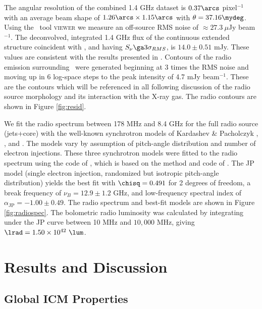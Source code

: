 \documentclass{emulateapj}
\begin{document}
The angular resolution of the combined 1.4 GHz dataset is $0.37\arcs$
pixel$^{-1}$ with an average beam shape of $1.26\arcs \times
1.15\arcs$ with $\theta = 37.16\mydeg$. Using the \casa\ tool
{\textsc{viewer}} we measure an off-source RMS noise of $\approx
27.3~\mu$Jy beam$^{-1}$. The deconvolved, integrated 1.4 GHz flux of
the continuous extended structure coincident with \iras, and having
$S_{\nu} \ga 3\sigma_{RMS}$, is $14.0 \pm 0.51$ mJy. These values are
consistent with the results presented in
\citet{1993ApJ...415...82H}. Contours of the radio emission
surrounding \iras\ were generated beginning at 3 times the RMS noise
and moving up in 6 log-space steps to the peak intensity of 4.7 mJy
beam$^{-1}$. These are the contours which will be referenced in all
following discussion of the radio source morphology and its
interaction with the X-ray gas. The radio contours are shown in Figure
\ref{fig:resid}.

We fit the radio spectrum between 178 MHz and 8.4 GHz for the full
radio source (jets+core) with the well-known synchrotron models of
Kardashev \& Pacholczyk \citep[KP][]{1962SvA.....6..317K, pach},
\citet[JP][]{1973A&A....26..423J}, and
\citet[CI][]{1987MNRAS.225..335H}. The models vary by assumption of
pitch-angle distribution and number of electron injections. These
three synchrotron models were fitted to the radio spectrum using the
code of \citet{2005ApJ...624..656W}, which is based on the method and
code of \citet{1991ApJ...383..554C}. The JP model (single electron
injection, randomized but isotropic pitch-angle distribution) yields
the best fit with $\chisq = 0.491$ for 2 degrees of freedom, a break
frequency of $\nu_B = 12.9 \pm 1.2$ GHz, and low-frequency spectral
index of $\alpha_{\mathrm{JP}} = -1.00 \pm 0.49$. The radio spectrum
and best-fit models are shown in Figure \ref{fig:radiospec}. The
bolometric radio luminosity was calculated by integrating under the JP
curve between 10 MHz and $10,000$ MHz, giving $\lrad =
1.50\times10^{42}~\lum$.

\section{Results and Discussion}
\label{sec:rd}

\subsection{Global ICM Properties}
\label{sec:global}
\end{document}
